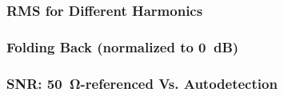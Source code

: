 
\begin{frame}
    \frametitle{RMS for Different Harmonics}
    \centering
    
\end{frame}

\begin{frame}
    \frametitle{Folding Back (normalized to \SI{0}{\dB})}
    \centering
    
\end{frame}

\begin{frame}
    \frametitle{SNR: \SI{50}{\ohm}-referenced Vs. Autodetection}
    \centering
    
\end{frame}
